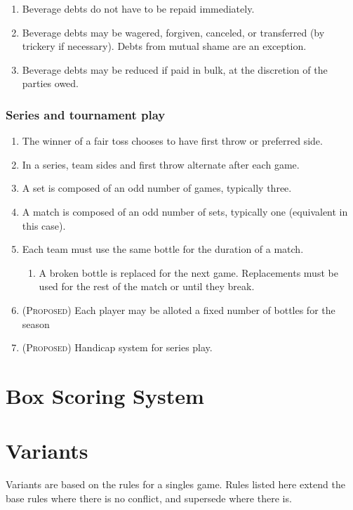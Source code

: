 \documentclass[11pt,letterpaper,twocolumn,english,DIV=calc]{scrartcl}
\newcommand{\proposed}{{\color{DarkRed} \textsc{(Proposed) }}}
\begin{document}
\begin{enumerate}[leftmargin=2.8em, label=\thesubsection.\arabic*]
	\item Beverage debts do not have to be repaid immediately.
	\item Beverage debts may be wagered, forgiven, canceled, or transferred (by trickery if necessary). 
	Debts from mutual shame are an exception.
	\item Beverage debts may be reduced if paid in bulk, at the discretion of the parties owed.
\end{enumerate}

\section{Series and tournament play}
\begin{enumerate}[label=\thesection.\arabic*]
	\item The winner of a fair toss chooses to have first throw or preferred side.
	\item In a series, team sides and first throw alternate after each game.
	\item A set is composed of an odd number of games, typically three.
	\item A match is composed of an odd number of sets, typically one (equivalent in this case).
	\item Each team must use the same bottle for the duration of a match.

	\begin{enumerate}
		\item A broken bottle is replaced for the next game. 
		Replacements must be used for the rest of the match or until they break.
	\end{enumerate}
	\item \proposed Each player may be alloted a fixed number of bottles for the season
	\item \proposed Handicap system for series play.

\end{enumerate}

\part*{Box Scoring System}

\part*{Variants}
\label{part:variants}

Variants are based on the rules for a singles game. Rules listed here extend the base rules where there is no conflict, and supersede where there is.
\end{document}

